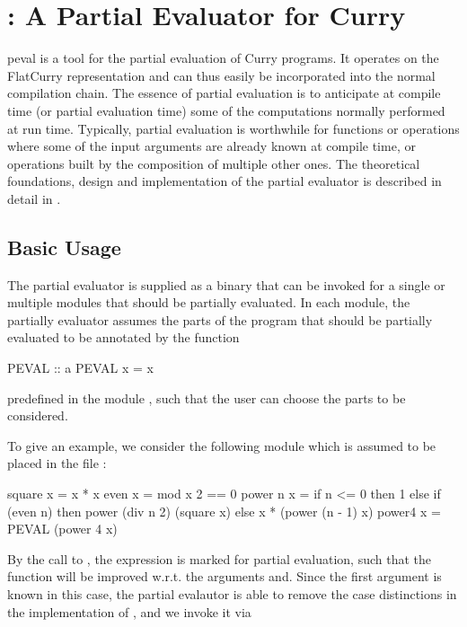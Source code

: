\section{: A Partial Evaluator for Curry}
\label{sec-peval}

peval
is a tool for the partial evaluation of Curry programs.
It operates on the FlatCurry representation and can thus
easily be incorporated into the normal compilation chain.
The essence of partial evaluation is to anticipate at compile time
(or partial evaluation time) some of the computations
normally performed at run time.
Typically, partial evaluation is worthwhile for functions or
operations where some of the input arguments are already known at compile time,
or operations built by the composition of multiple other ones.
The theoretical foundations, design and implementation of
the partial evaluator is described in detail in \cite{Peemoeller2016}.

\subsection{Basic Usage}

The partial evaluator is supplied as a binary that can be invoked
for a single or multiple modules that should be partially evaluated.
In each module, the partially evaluator assumes the parts of the program
that should be partially evaluated to be annotated by the function
\begin{curry}
PEVAL :: a
PEVAL x = x
\end{curry}
predefined in the module ,
such that the user can choose the parts to be considered.

To give an example, we consider the following module which is assumed
to be placed in the file :
\begin{curry}
square  x = x * x
even    x = mod x 2 == 0
power n x = if n <= 0 then 1
                      else if (even n) then power (div n 2) (square x)
                                       else x * (power (n - 1) x)
power4  x = PEVAL (power 4 x)
\end{curry}
By the call to , the expression 
is marked for partial evaluation, such that the function 
will be improved w.r.t. the arguments  and.
Since the first argument is known in this case,
the partial evalautor is able to remove the case distinctions
in the implementation of , and we invoke it via

